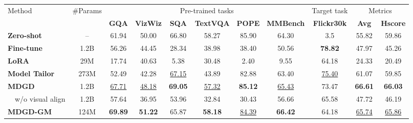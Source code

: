 \begin{table*}[ht]
  \centering
  \small
  \begin{tabular}{lcccccccccc}
    \toprule
    \multirow{2}{*}{Method} & \multirow{2}{*}{\#Params} & \multicolumn{6}{c}{Pre-trained tasks} & \multicolumn{1}{c}{Target task} & \multicolumn{2}{c}{Metrics} \\
    \cmidrule(lr){3-8} \cmidrule(lr){9-9}  \cmidrule(lr){10-11}
                    &        & \textbf{GQA}              & \textbf{VizWiz}                & \textbf{SQA}                   & \textbf{TextVQA} & \textbf{POPE} & \textbf{MMBench} & \textbf{Flickr30k} & \textbf{Avg} & \textbf{Hscore} \\
    \midrule
    \textbf{Zero-shot}       & --      & 61.94            & 50.00                 & 66.80                 & 58.27 & 85.90 & 64.30 & 3.5 & 55.82  & 59.86 \\
    \midrule
    \textbf{Fine-tune}       & 1.2B   & 56.26            & 44.45                 & 28.34                 & 38.98 & 38.40 & 50.56 & \textbf{78.82} & 47.97 & 45.26 \\
    \textbf{LoRA}            & 29M   & 17.74            & 40.63                 & 5.38                  & 30.48 & 2.40  & 9.55  & 64.18 & 24.33 & 20.49 \\
    \textbf{Model Tailor}    & 273M   & 52.49            & 42.28                 & \underline{67.15}     & 43.89 & 82.88 & 63.40 & \underline{75.40} & 61.07 & 59.85 \\
    \midrule
    \textbf{MDGD}             & 1.2B   & \underline{67.71}  & \underline{48.18} & \textbf{69.05}         & \underline{57.32} & \textbf{85.12} & \underline{65.43} & 73.47 & \textbf{66.61} & \textbf{66.03} \\
    ~~w/o visual align     & 1.2B   & 57.64           & 36.95                 & 53.96                 & 32.84 & 30.43 & 56.66 & 65.58 & 47.72 & 46.19 \\
    \textbf{MDGD-GM } & 124M   & \textbf{69.89}  & \textbf{51.22}        & 65.87                 & \textbf{58.18} & \underline{84.39} & \textbf{66.42} & 64.18  & \underline{65.74} & \underline{65.86} \\
    \bottomrule
    \toprule


\end{tabular}
\end{table*}
